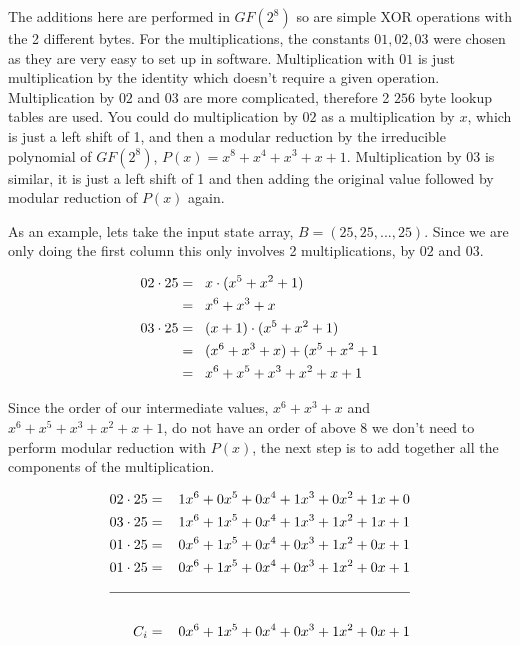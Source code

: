 The additions here are performed in $GF(2^8)$ so are simple XOR operations with the 2 different bytes. For the multiplications, the constants $01,02,03$ were chosen as they are very easy to set up in software. Multiplication with $01$ is just multiplication by the identity which doesn't require a given operation. Multiplication by $02$ and $03$ are more complicated, therefore 2 $256$ byte lookup tables are used. You could do multiplication by $02$ as a multiplication by $x$, which is just a left shift of 1, and then a modular reduction by the irreducible polynomial of $GF(2^8)$, $P(x) = x^8 + x^4 + x^3 + x + 1$. Multiplication by $03$ is similar, it is just a left shift of 1 and then adding the original value followed by modular reduction of $P(x)$ again.

As an example, lets take the input state array, $B = (25,25,...,25)$. Since we are only doing the first column this only involves 2 multiplications, by $02$ and $03$. 

\vspace{-1cm}
\begin{center}
\begin{align*}
02 \cdot 25 =& \hspace{0.3cm} x \cdot (x^5 + x^2 + 1) \\
            =& \hspace{0.3cm} x^6 + x^3 + x \\
03 \cdot 25 =& \hspace{0.3cm} (x + 1) \cdot (x^5 + x^2 + 1) \\
            =& \hspace{0.3cm} (x^6 + x^3 + x) + (x^5 + x^2 + 1 \\
            =& \hspace{0.3cm} x^6 + x^5 + x^3 + x^2 + x + 1
\end{align*}
\end{center}

Since the order of our intermediate values, $x^6 + x^3 + x$ and $x^6 + x^5 + x^3 + x^2 + x + 1$, do not have an order of above $8$ we don't need to perform modular reduction with $P(x)$, the next step is to add together all the components of the multiplication.

\vspace{-1cm}
\begin{center}
\begin{align*}
02 \cdot 25 &= \hspace{0.3cm} 1x^6 + 0x^5 + 0x^4 + 1x^3 + 0x^2 + 1x + 0 \\
03 \cdot 25 &= \hspace{0.3cm} 1x^6 + 1x^5 + 0x^4 + 1x^3 + 1x^2 + 1x + 1 \\
01 \cdot 25 &= \hspace{0.3cm} 0x^6 + 1x^5 + 0x^4 + 0x^3 + 1x^2 + 0x + 1 \\
01 \cdot 25 &= \hspace{0.3cm} 0x^6 + 1x^5 + 0x^4 + 0x^3 + 1x^2 + 0x + 1 \\
\cline{1-2} \\
C_i &= \hspace{0.3cm} 0x^6 + 1x^5 + 0x^4 + 0x^3 + 1x^2 + 0x + 1
\end{align*}
\end{center}

